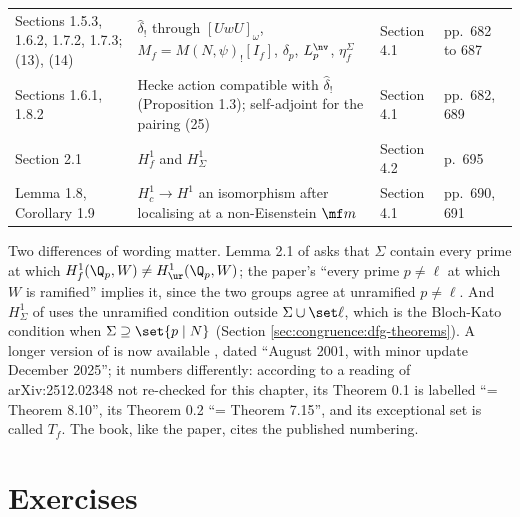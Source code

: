 \begin{remark}
\begin{center}
\begin{tabular}{p{}p{}p{}p{}}
Sections 1.5.3, 1.6.2, 1.7.2, 1.7.3; (13), (14) & $\hat\delta_!$ through $[UwU]_\omega$, $M_f=M(N,\psi)_![I_f]$, $\delta_p$, $L^{\nv}_p$, $\eta^\Sigma_f$ & Section 4.1 & pp.~682 to 687\\
Sections 1.6.1, 1.8.2 & Hecke action compatible with $\hat\delta_!$ (Proposition 1.3); self-adjoint for the pairing (25) & Section 4.1 & pp.~682, 689\\
Section 2.1 & $H^1_f$ and $H^1_\Sigma$ & Section 4.2 & p.~695\\
Lemma 1.8, Corollary 1.9 & $H^1_c\to H^1$ an isomorphism after localising at a non-Eisenstein $\mf m$ & Section 4.1 & pp.~690, 691\\
\bottomrule
\end{tabular}
\end{center}
Two differences of wording matter. Lemma 2.1 of \cite{DFG04} asks that $\Sigma$ contain every prime at which $H^1_f(\Q_p,W)\ne H^1_{\ur}(\Q_p,W)$; the paper's ``every prime $p\ne\ell$ at which $W$ is ramified''
implies it, since the two groups agree at unramified $p\ne\ell$. And $H^1_\Sigma$ of \cite{DFG04} uses the unramified condition outside $\Sigma\cup\set\ell$, which is the Bloch-Kato condition when
$\Sigma\supseteq\set{p\mid N}$ (Section \ref{sec:congruence:dfg-theorems}). A longer version of \cite{DFG04} is now available \cite{DFG04long}, dated ``August 2001, with minor update December 2025''; it
numbers differently: according to a reading of arXiv:2512.02348 not re-checked for this chapter, its Theorem 0.1 is labelled ``= Theorem 8.10'', its Theorem 0.2 ``= Theorem 7.15'', and its
exceptional set is called $T_f$. The book, like the paper, cites the published numbering.
\end{remark}

\section{Exercises}\label{sec:congruence:exercises}

